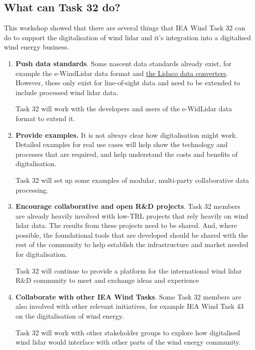 \subsection{What can Task 32 do?}

This workshop showed that there are several things that IEA Wind Task 32 can do to support the digitalisation of wind lidar and it's integration into a digitalised wind energy business.

\begin{enumerate}
\item
  \textbf{Push data standards}. Some nascent data standards already exist,
  for example the e-WindLidar data format \cite{nikola_vasiljevic_2018_2478051} and \href{https://github.com/e-WindLidar/Lidaco}{the Lidaco data converters}. However, these only exist for line-of-sight data   and need to be extended to include processed wind lidar data. 
  \begin{taskactions}
    Task 32 will work with the developers and users of the e-WidLidar data format to extend it.
  \end{taskactions}
\item
  \textbf{Provide examples.} It is not always clear how digitalisation might work. Detailed examples for real use cases will help show the technology and processes that are required, and help understand the costs and benefits of digitalisation.
  \begin{taskactions}
    Task 32 will set up some examples of modular, multi-party collaborative data processing.
  \end{taskactions}
\item  
  \textbf{Encourage collaborative and open R\&D projects}. Task 32 members are
  already heavily involved with low-TRL projects that rely heavily on
  wind lidar data. The results from these projects need to be shared.
  And, where possible, the foundational tools that are developed should
  be shared with the rest of the community to help establish the
  infrastructure and market needed for digitalisation.
  \begin{taskactions}
    Task 32 will continue to provide a platform for the international wind lidar R\&D community to meet and exchange ideas and experience
  \end{taskactions}
\item
  \textbf{Collaborate with other IEA Wind Tasks}. Some Task 32 members
  are also involved with other relevant initiatives, for example IEA
  Wind Task 43 on the digitalisation of wind energy. 
  \begin{taskactions} 
  Task 32 will work with other stakeholder groups to explore how digitalised wind lidar would interface with
  other parts of the wind energy community.
  \end{taskactions}
\end{enumerate}
